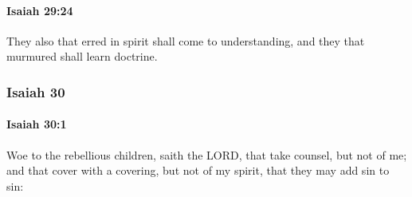 		\paragraph{Isaiah 29:24} %
			\label{ISAIAH-29-24}

			They also that erred in spirit shall come to understanding, and they that murmured shall learn doctrine.

	\subsubsection{Isaiah 30} %
		\label{ISAIAH-30}

		\paragraph{Isaiah 30:1} %
			\label{ISAIAH-30-1}

			Woe to the rebellious children, saith the LORD, that take counsel, but not of me; and that cover with a covering, but not of my spirit, that they may add sin to sin:

